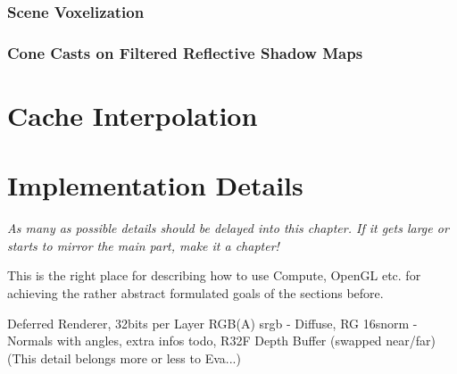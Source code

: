 \documentclass[thesis.tex]{subfiles}
\begin{document}
\subsubsection{Scene Voxelization}

\subsubsection{Cone Casts on Filtered Reflective Shadow Maps}


\section{Cache Interpolation}



\section{Implementation Details}

\emph{As many as possible details should be delayed into this chapter. If it gets large or starts to mirror the main part, make it a chapter!}

This is the right place for describing how to use Compute, OpenGL etc. for achieving the rather abstract formulated goals of the sections before.

Deferred Renderer, 32bits per Layer RGB(A) srgb - Diffuse, RG 16snorm - Normals with angles, extra infos todo, R32F Depth Buffer (swapped near/far)\\
(This detail belongs more or less to Eva...)

\subfilebib %
\end{document}
